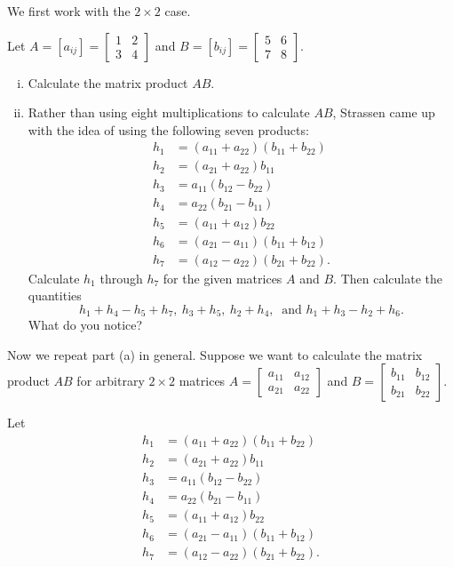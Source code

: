 \begin{pactivity} \label{:pact:Strassen_1} We first work with the $2 \times 2$ case.
\ba
\item Let $A = [a_{ij}] = \left[ \begin{array}{cc} 1&2\\3&4 \end{array} \right]$ and $B =  [b_{ij}] = \left[ \begin{array}{cc} 5&6\\7&8 \end{array} \right]$. 
	\begin{enumerate}[i.]
	\item Calculate the matrix product $AB$. 

	\item Rather than using eight multiplications to calculate $AB$, Strassen came up with the idea of using the following seven products:
\begin{align*}
h_1 &= (a_{11}+a_{22})(b_{11}+b_{22}) \\
h_2 &= (a_{21}+a_{22})b_{11} \\
h_3 &= a_{11}(b_{12}-b_{22}) \\
h_4 &= a_{22}(b_{21}-b_{11}) \\
h_5 &= (a_{11}+a_{12})b_{22} \\
h_6 &=(a_{21}-a_{11})(b_{11}+b_{12}) \\
h_7 &= (a_{12}-a_{22})(b_{21}+b_{22}).
\end{align*}
Calculate $h_1$ through $h_7$ for the given matrices $A$ and $B$. Then calculate the quantities
\[h_1+h_4-h_5+h_7,  \  h_3+h_5, \  h_2+h_4, \ \text{ and }  h_1+h_3-h_2+h_6 .\]
What do you notice?


	\end{enumerate}


\item Now we repeat part (a) in general. Suppose we want to calculate the matrix product $AB$ for arbitrary $2 \times 2$ matrices $A = \left[ \begin{array}{cc} a_{11}&a_{12}\\a_{21}&a_{22} \end{array} \right]$ and $B = \left[ \begin{array}{cc} b_{11}&b_{12}\\b_{21}&b_{22} \end{array} \right]$.

Let 
\begin{align*}
h_1 &= (a_{11}+a_{22})(b_{11}+b_{22}) \\
h_2 &= (a_{21}+a_{22})b_{11} \\
h_3 &= a_{11}(b_{12}-b_{22}) \\
h_4 &= a_{22}(b_{21}-b_{11}) \\
h_5 &= (a_{11}+a_{12})b_{22} \\
h_6 &=(a_{21}-a_{11})(b_{11}+b_{12}) \\
h_7 &= (a_{12}-a_{22})(b_{21}+b_{22}).
\end{align*}


\end{pactivity}
